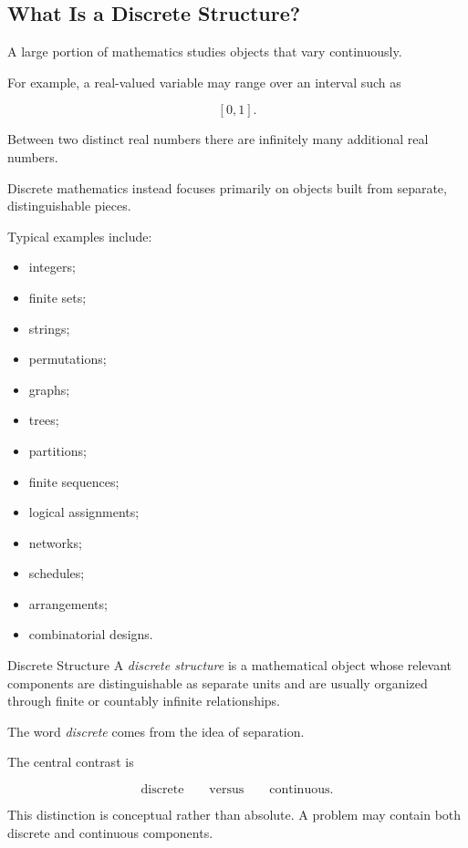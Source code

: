 \subsection{What Is a Discrete Structure?}
\label{subsec:what-is-discrete-structure}

A large portion of mathematics studies objects that vary continuously.

For example, a real-valued variable may range over an interval such as

\[
[0,1].
\]

Between two distinct real numbers there are infinitely many additional
real numbers.

Discrete mathematics instead focuses primarily on objects built from
separate, distinguishable pieces.

Typical examples include:

\begin{itemize}
    \item integers;
    \item finite sets;
    \item strings;
    \item permutations;
    \item graphs;
    \item trees;
    \item partitions;
    \item finite sequences;
    \item logical assignments;
    \item networks;
    \item schedules;
    \item arrangements;
    \item combinatorial designs.
\end{itemize}

\begin{definitionbox}{Discrete Structure}
A \emph{discrete structure} is a mathematical object whose relevant
components are distinguishable as separate units and are usually
organized through finite or countably infinite relationships.
\end{definitionbox}

The word \emph{discrete} comes from the idea of separation.

The central contrast is

\[
\boxed{
\text{discrete}
\qquad\text{versus}\qquad
\text{continuous}.
}
\]

This distinction is conceptual rather than absolute. A problem may
contain both discrete and continuous components.

